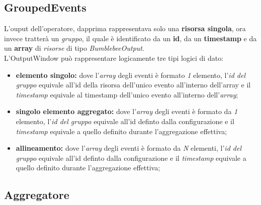 \subsection{GroupedEvents}
L'ouput dell'operatore, dapprima rappresentava solo una \textbf{risorsa singola}, ora invece tratterà un \textit{gruppo}, il quale è identificato da un \textbf{id}, da un \textbf{\gls{timestamp}} e da un \textbf{array} di \textit{risorse} di tipo \textit{BumblebeeOutput}.\\
L'OutputWindow può rappresentare logicamente tre tipi logici di dato:
\begin{itemize}
	\item{\textbf{elemento singolo:} dove l'\textit{array} degli eventi è formato \textit{1} elemento, l'\textit{id del gruppo} equivale all'id della risorsa dell'unico evento all'interno dell'array e il \textit{\gls{timestamp}} equivale al \gls{timestamp} dell'unico evento all'interno dell'\textit{array};}
	\item{\textbf{singolo elemento aggregato:} dove l'\textit{array} degli eventi è formato da \textit{1} elemento, l'\textit{id del gruppo} equivale all'id definto dalla configurazione e il \textit{\gls{timestamp}} equivale a quello definito durante l'aggregazione effettiva;}
	\item{\textbf{allineamento:} dove l'\textit{array} degli eventi è formato da \textit{N} elementi, l'\textit{id del gruppo} equivale all'id definto dalla configurazione e il \textit{\gls{timestamp}} equivale a quello definito durante l'aggregazione effettiva;}
\end{itemize}

\subsection{Aggregatore}




